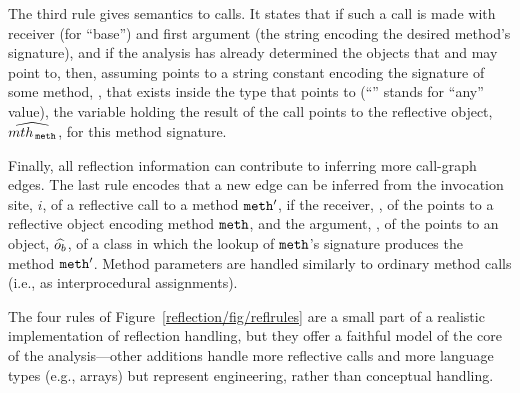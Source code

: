 The third rule gives semantics to  calls.  It states
that if such a call is made with receiver  (for ``base'') and
first argument  (the string encoding the desired method's
signature), and if the analysis has already determined the objects
that  and  may point to, then, assuming  points
to a string constant encoding the signature of some method,
, that exists inside the type that  points to
(``\var{\_}'' stands for ``any'' value), the variable  holding
the result of the  call points to the reflective
object, \(\widehat{mth_{\,\texttt{meth}}}\), for this method signature.

Finally, all reflection information can contribute to inferring more
call-graph edges. The last rule encodes that a new edge can be
inferred from the invocation site, \(i\), of a reflective
 call to a method \(\texttt{meth}'\), if the receiver,
, of the  points to a reflective object encoding
method \(\texttt{meth}\), and the argument, , of the
 points to an object, \(\widehat{o_b}\), of a class in
which the lookup of \(\texttt{meth}\)'s signature produces the method
\(\texttt{meth}'\). Method parameters are handled similarly to ordinary
method calls (i.e., as interprocedural assignments).

The four rules of Figure~\ref{reflection/fig/reflrules} are a small
part of a realistic implementation of reflection handling, but they
offer a faithful model of the core of the analysis---other additions
handle more reflective calls and more language types (e.g., arrays)
but represent engineering, rather than conceptual handling.


